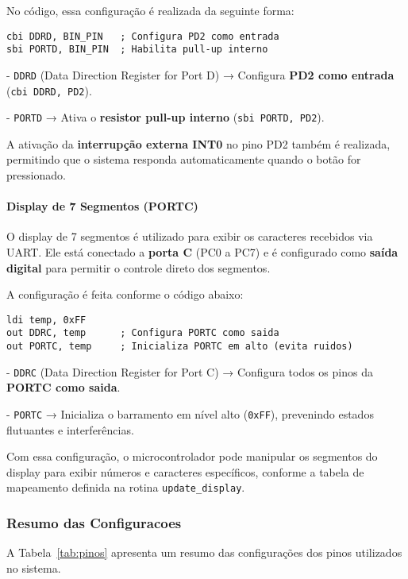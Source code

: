 \documentclass{sbrt}
\begin{document}
No código, essa configuração é realizada da seguinte forma:

\begin{lstlisting}[style=assemblyStyle, caption={Configuracao do botao como entrada digital}, label={lst:botao}]
cbi DDRD, BIN_PIN   ; Configura PD2 como entrada
sbi PORTD, BIN_PIN  ; Habilita pull-up interno
\end{lstlisting}

- \texttt{DDRD} (Data Direction Register for Port D) → Configura \textbf{PD2 como entrada} (\texttt{cbi DDRD, PD2}).

- \texttt{PORTD} → Ativa o \textbf{resistor pull-up interno} (\texttt{sbi PORTD, PD2}).

A ativação da \textbf{interrupção externa INT0} no pino PD2 também é realizada, permitindo que o sistema responda automaticamente quando o botão for pressionado.

\paragraph{Display de 7 Segmentos (PORTC)}
O display de 7 segmentos é utilizado para exibir os caracteres recebidos via UART. Ele está conectado a \textbf{porta C} (PC0 a PC7) e é configurado como \textbf{saída digital} para permitir o controle direto dos segmentos.

A configuração é feita conforme o código abaixo:

\begin{lstlisting}[style=assemblyStyle, caption={Configuracao do display de 7 segmentos}, label={lst:display}]
ldi temp, 0xFF
out DDRC, temp      ; Configura PORTC como saida
out PORTC, temp     ; Inicializa PORTC em alto (evita ruidos)
\end{lstlisting}

- \texttt{DDRC} (Data Direction Register for Port C) → Configura todos os pinos da \textbf{PORTC como saida}.

- \texttt{PORTC} → Inicializa o barramento em nível alto (\texttt{0xFF}), prevenindo estados flutuantes e interferências.

Com essa configuração, o microcontrolador pode manipular os segmentos do display para exibir números e caracteres específicos, conforme a tabela de mapeamento definida na rotina \texttt{update\_display}.

\subsubsection{Resumo das Configuracoes}
A Tabela~\ref{tab:pinos} apresenta um resumo das configurações dos pinos utilizados no sistema.
\end{document}
